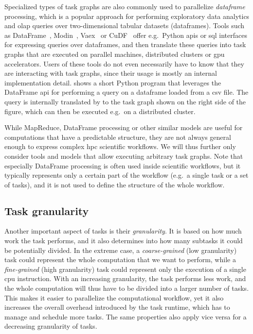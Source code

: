 Specialized types of task graphs are also commonly used to parallelize \emph{dataframe}
processing, which is a popular approach for performing exploratory data analytics and
\gls{olap} queries over two-dimensional tabular datasets (dataframes). Tools such
as \dask{} DataFrame~\cite{dask},
Modin~\cite{modin}, Vaex~\cite{vaex} or
CuDF~\cite{cudf} offer e.g.\ Python \glspl{api} or
\gls{sql} interfaces for expressing queries over dataframes, and then translate
these queries into task graphs that are executed on parallel machines, distributed clusters or
\gls{gpu} accelerators. Users of these tools do not even necessarily have to know
that they are interacting with task graphs, since their usage is mostly an internal implementation
detail.  shows a short Python program that leverages the
\dask{} DataFrame \gls{api} for performing a query on a
dataframe loaded from a \gls{csv} file. The query is internally translated by
\dask{} to the task graph shown on the right side of the figure, which can then
be executed e.g.\ on a distributed cluster.

While MapReduce, DataFrame processing or other similar models are useful for computations that have
a predictable structure, they are not always general enough to express complex
\gls{hpc} scientific workflows. We will thus further only consider tools and
models that allow executing arbitrary task graphs. Note that especially DataFrame processing is
often used inside scientific workflows, but it typically represents only a certain part of the
workflow (e.g.\ a single task or a set of tasks), and it is not used to define the structure of the
whole workflow.

\subsection{Task granularity}
Another important aspect of tasks is their \emph{granularity}. It is based on how much
work the task performs, and it also determines into how many subtasks it could be potentially
divided. In the extreme case, a \emph{coarse-grained} (low granularity) task could represent the whole
computation that we want to perform, while a \emph{fine-grained} (high granularity) task could represent only
the execution of a single \gls{cpu} instruction. With an increasing granularity,
the task performs less work, and the whole computation will thus have to be divided into a larger
number of tasks. This makes it easier to parallelize the computational workflow, yet it also
increases the overall overhead introduced by the task runtime, which has to manage and schedule
more tasks. The same properties also apply vice versa for a decreasing granularity of tasks.

